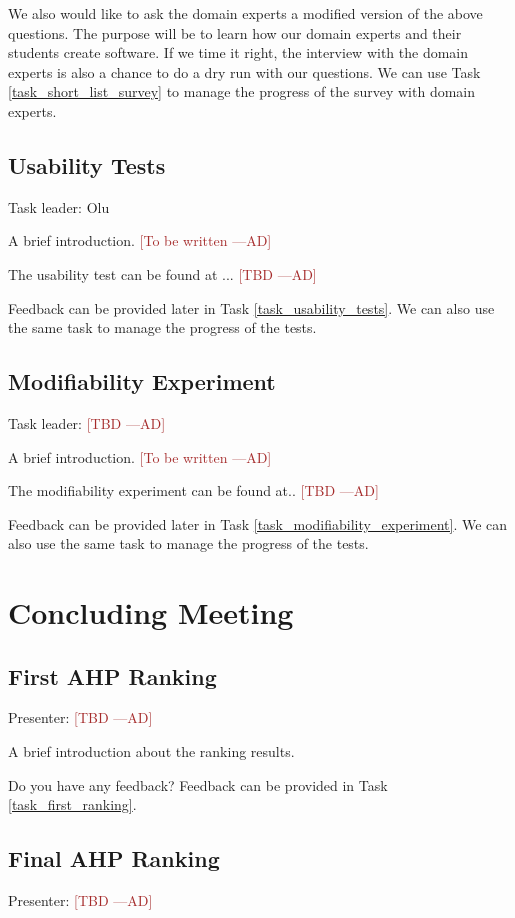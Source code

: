 \documentclass[12pt]{article}
\newcommand{\authornote}[3]{\textcolor{#1}{[#3 ---#2]}}
\newcommand{\authornote}[3]{}
\newcommand{\ad}[1]{\authornote{brown}{AD}{#1}} %
\begin{document}
We also would like to ask the domain experts a modified version of the above
questions. The purpose will be to learn how our domain experts and their
students create software. If we time it right, the interview with the domain
experts is also a chance to do a dry run with our questions. We can use Task
\ref{task_short_list_survey} to manage the progress of the survey with domain
experts.

\subsection{Usability Tests}
\label{usability_tests}
Task leader: Olu

A brief introduction. \ad{To be written}

The usability test can be found at ... \ad{TBD}

Feedback can be provided later in Task
\ref{task_usability_tests}. We can also use the same task to manage the progress of the tests.

\subsection{Modifiability Experiment}
\label{modifiability_experiment}
Task leader: \ad{TBD}

A brief introduction. \ad{To be written} 

The modifiability experiment can be found at.. \ad{TBD}

Feedback can be provided later in Task
\ref{task_modifiability_experiment}. We can also use the same task to manage the
progress of the tests.

\section{Concluding Meeting}
\label{concluding_meeting}

\subsection{First AHP Ranking}
\label{first_AHP}
Presenter: \ad{TBD}

A brief introduction about the ranking results.

Do you have any feedback? Feedback can be provided in Task \ref{task_first_ranking}.

\subsection{Final AHP Ranking}
\label{final_AHP}
Presenter: \ad{TBD}
\end{document}

